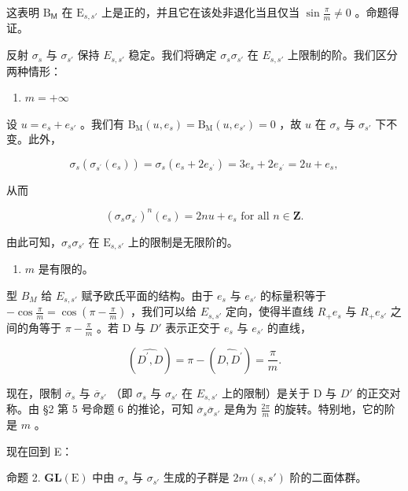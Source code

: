 这表明 \(\mathrm{B}_{\mathsf{M}}\) 在 \(\mathrm{E}_{s,s'}\) 上是正的，并且它在该处非退化当且仅当 \(\sin \frac{\pi}{m} \neq 0\) 。命题得证。

反射 \(\sigma_{s}\) 与 \(\sigma_{s'}\) 保持 \(E_{s,s'}\) 稳定。我们将确定 \(\sigma_{s}\sigma_{s'}\) 在 \(E_{s,s'}\) 上限制的阶。我们区分两种情形：

\begin{enumerate}
\def\labelenumi{\alph{enumi})}
\tightlist
\item
  \(m = +\infty\)
\end{enumerate}

设 \(u = e_s + e_{s'}\) 。我们有 \(\mathrm{B}_{\mathrm{M}}(u, e_s) = \mathrm{B}_{\mathrm{M}}(u, e_{s'}) = 0\) ，故 \(u\) 在 \(\sigma_s\) 与 \(\sigma_{s'}\) 下不变。此外，

\[
\sigma_ {s} \left(\sigma_ {s ^ {\prime}} \left(e _ {s}\right)\right) = \sigma_ {s} \left(e _ {s} + 2 e _ {s ^ {\prime}}\right) = 3 e _ {s} + 2 e _ {s ^ {\prime}} = 2 u + e _ {s},
\]

从而

\[
\left(\sigma_ {s} \sigma_ {s ^ {\prime}}\right) ^ {n} \left(e _ {s}\right) = 2 n u + e _ {s} \text {   for   all   } n \in \mathbf {Z}.
\]

由此可知，\(\sigma_s\sigma_{s'}\) 在 \(\mathrm{E}_{s,s'}\) 上的限制是无限阶的。

\begin{enumerate}
\def\labelenumi{\alph{enumi})}
\setcounter{enumi}{1}
\tightlist
\item
  \(m\) 是有限的。
\end{enumerate}

型 \(B_{M}\) 给 \(E_{s,s'}\) 赋予欧氏平面的结构。由于 \(e_{s}\) 与 \(e_{s'}\) 的标量积等于 \(-\cos\frac{\pi}{m}=\cos\left(\pi-\frac{\pi}{m}\right)\) ，我们可以给 \(E_{s,s'}\) 定向，使得半直线 \(R_{+}e_{s}\) 与 \(R_{+}e_{s'}\) 之间的角等于 \(\pi-\frac{\pi}{m}\) 。若 D 与 \(D'\) 表示正交于 \(e_{s}\) 与 \(e_{s'}\) 的直线，

\[
(\widehat {D ^ {\prime} , D}) = \pi - (\widehat {D , D ^ {\prime}}) = \frac {\pi}{m}.
\]

现在，限制 \(\overline{\sigma}_s\) 与 \(\overline{\sigma}_{s'}\) （即 \(\sigma_s\) 与 \(\sigma_{s'}\) 在 \(E_{s,s'}\) 上的限制）是关于 D 与 \(D'\) 的正交对称。由 §2 第 5 号命题 6 的推论，可知 \(\overline{\sigma}_s\overline{\sigma}_{s'}\) 是角为 \(\frac{2\pi}{m}\) 的旋转。特别地，它的阶是 \(m\) 。

现在回到 E：

命题 2. \(\mathbf{GL}(\mathrm{E})\) 中由 \(\sigma_s\) 与 \(\sigma_{s'}\) 生成的子群是 \(2m(s,s')\) 阶的二面体群。

